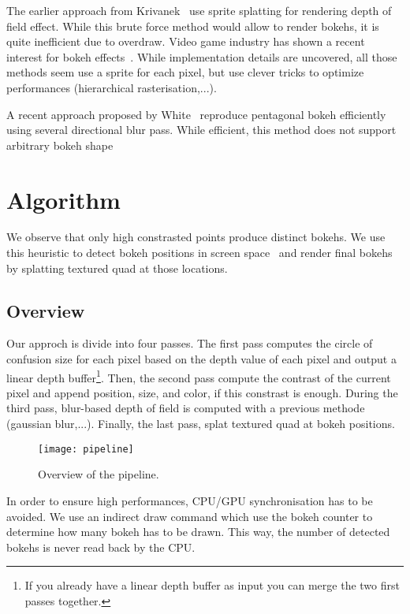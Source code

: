 The earlier approach from Krivanek~\cite{Krivanek03} use sprite splatting for rendering depth of field effect. While this brute force method would allow to render bokehs, it is quite inefficient due to overdraw. Video game industry has shown a recent interest for bokeh effects~\cite{Sousa11,Futurmark11,Mittring11}. While implementation details are uncovered, all those methods seem use a sprite for each pixel, but use clever tricks to optimize performances (hierarchical rasterisation,...). 

A recent approach proposed by White~\cite{White11} reproduce pentagonal bokeh efficiently using several directional blur pass. While efficient, this method does not support arbitrary bokeh shape

\section{Algorithm}
We observe that only high constrasted points produce distinct bokehs. We use this heuristic to detect bokeh positions in screen space~\cite{Pettineo11} and render final bokehs by splatting textured quad at those locations.

\subsection{Overview}
Our approch is divide into four passes. The first pass computes the circle of confusion size for each pixel based on the depth value of each pixel and output a linear depth buffer\footnote{If you already have a linear depth buffer as input you can merge the two first passes together.}. Then, the second pass compute the contrast of the current pixel and append position, size, and color, if this constrast is enough. During the third pass, blur-based depth of field is computed with a previous methode (gaussian blur,...). Finally, the last pass, splat textured quad at bokeh positions.

	\begin{figure}[htb]\centering
	\texttt{[image: pipeline]}
	\caption{Overview of the pipeline.}
	\label{YourName:fig1}
	\end{figure}

In order to ensure high performances, CPU/GPU synchronisation has to be avoided. We use an indirect draw command which use the bokeh counter to determine how many bokeh has to be drawn. This way, the number of detected bokehs is never read back by the CPU.

